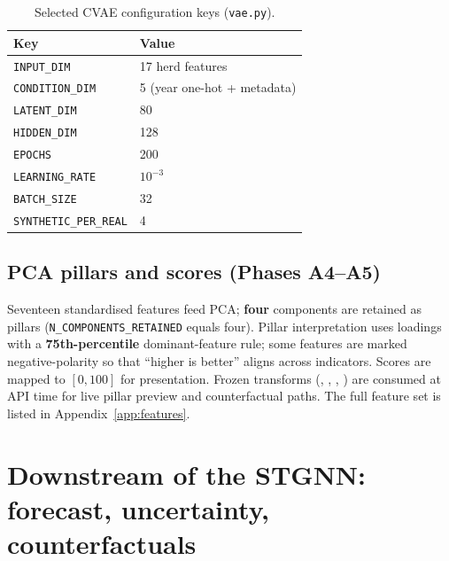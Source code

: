 \documentclass[11pt,a4paper]{article}
\begin{document}
\begin{table}[H]
  \centering
  \caption{Selected CVAE configuration keys (\texttt{vae.py}).}
  \label{tab:cvae}
  \begin{tabular}{@{}ll@{}}
    \toprule
    \textbf{Key} & \textbf{Value} \\
    \midrule
    \texttt{INPUT\_DIM} & 17 herd features \\
    \texttt{CONDITION\_DIM} & 5 (year one-hot + metadata) \\
    \texttt{LATENT\_DIM} & 80 \\
    \texttt{HIDDEN\_DIM} & 128 \\
    \texttt{EPOCHS} & 200 \\
    \texttt{LEARNING\_RATE} & $10^{-3}$ \\
    \texttt{BATCH\_SIZE} & 32 \\
    \texttt{SYNTHETIC\_PER\_REAL} & 4 \\
    \bottomrule
  \end{tabular}
\end{table}

\subsection{PCA pillars and scores (Phases A4--A5)}
Seventeen standardised features feed PCA; \textbf{four} components are retained as pillars (\texttt{N\_COMPONENTS\_RETAINED} equals four). Pillar interpretation uses loadings with a \textbf{75th-percentile} dominant-feature rule; some features are marked negative-polarity so that ``higher is better'' aligns across indicators. Scores are mapped to $[0,100]$ for presentation. Frozen transforms (, , , ) are consumed at API time for live pillar preview and counterfactual paths. The full feature set is listed in Appendix~\ref{app:features}.

\section{Downstream of the STGNN: forecast, uncertainty, counterfactuals}
\end{document}
